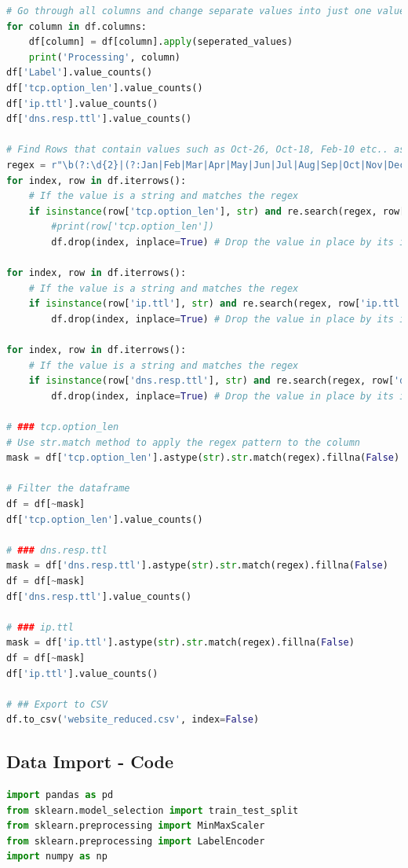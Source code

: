 \begin{appendices}
\begin{lstlisting}[language=Python]
# Go through all columns and change separate values into just one value
for column in df.columns:
    df[column] = df[column].apply(seperated_values)
    print('Processing', column)
df['Label'].value_counts()
df['tcp.option_len'].value_counts()
df['ip.ttl'].value_counts()
df['dns.resp.ttl'].value_counts()

# Find Rows that contain values such as Oct-26, Oct-18, Feb-10 etc.. as these appear to be invalid and we will drop these rows.
regex = r"\b(?:\d{2}|(?:Jan|Feb|Mar|Apr|May|Jun|Jul|Aug|Sep|Oct|Nov|Dec))-(?:\d{2}|(?:Jan|Feb|Mar|Apr|May|Jun|Jul|Aug|Sep|Oct|Nov|Dec))\b"
for index, row in df.iterrows():
    # If the value is a string and matches the regex
    if isinstance(row['tcp.option_len'], str) and re.search(regex, row['tcp.option_len']):
        #print(row['tcp.option_len'])
        df.drop(index, inplace=True) # Drop the value in place by its index

for index, row in df.iterrows():
    # If the value is a string and matches the regex
    if isinstance(row['ip.ttl'], str) and re.search(regex, row['ip.ttl']):
        df.drop(index, inplace=True) # Drop the value in place by its index

for index, row in df.iterrows():
    # If the value is a string and matches the regex
    if isinstance(row['dns.resp.ttl'], str) and re.search(regex, row['dns.resp.ttl']):
        df.drop(index, inplace=True) # Drop the value in place by its index

# ### tcp.option_len
# Use str.match method to apply the regex pattern to the column
mask = df['tcp.option_len'].astype(str).str.match(regex).fillna(False)

# Filter the dataframe
df = df[~mask]
df['tcp.option_len'].value_counts()

# ### dns.resp.ttl
mask = df['dns.resp.ttl'].astype(str).str.match(regex).fillna(False)
df = df[~mask]
df['dns.resp.ttl'].value_counts()

# ### ip.ttl
mask = df['ip.ttl'].astype(str).str.match(regex).fillna(False)
df = df[~mask]
df['ip.ttl'].value_counts()

# ## Export to CSV
df.to_csv('website_reduced.csv', index=False)	
\end{lstlisting}

\subsection{Data Import - Code}
\label{appx: Data Import - Code}
\begin{lstlisting}[language=Python]
import pandas as pd
from sklearn.model_selection import train_test_split
from sklearn.preprocessing import MinMaxScaler
from sklearn.preprocessing import LabelEncoder
import numpy as np


\end{lstlisting}
\end{appendices}
